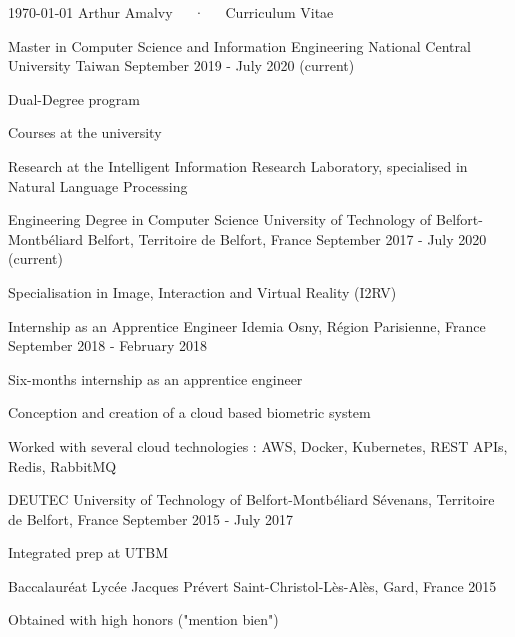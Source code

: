 \documentclass[11pt, a4paper]{awesome-cv}
\begin{document}
\makecvheader

\makecvfooter
  {\today}
  {Arthur Amalvy~~~·~~~Curriculum Vitae}
  {\thepage}



\begin{cventries}

  \cventry
  {Master in Computer Science and Information Engineering} %
  {National Central University} %
  {Taiwan} %
  {September 2019 - July 2020 (current)} %
  {
    \begin{cvitems} %
      \item Dual-Degree program
      \item Courses at the university 
      \item Research at the Intelligent Information Research Laboratory, specialised in Natural Language Processing
    \end{cvitems}
  }

  \cventry
  {Engineering Degree in Computer Science}
  {University of Technology of Belfort-Montbéliard}
  {Belfort, Territoire de Belfort, France}
  {September 2017 - July 2020 (current)}
  {
    \begin{cvitems}
      \item Specialisation in Image, Interaction and Virtual Reality (I2RV)
    \end{cvitems}
  }

  \cventry
  {Internship as an Apprentice Engineer}
  {Idemia}
  {Osny, Région Parisienne, France}
  {September 2018 - February 2018}
  {
    \begin{cvitems}
      \item Six-months internship as an apprentice engineer
      \item Conception and creation of a cloud based biometric system
      \item Worked with several cloud technologies : AWS, Docker, Kubernetes, REST APIs, Redis, RabbitMQ
    \end{cvitems}
  }

  \cventry
  {DEUTEC}
  {University of Technology of Belfort-Montbéliard}
  {Sévenans, Territoire de Belfort, France}
  {September 2015 - July 2017}
  {
    \begin{cvitems}
      \item Integrated prep at UTBM
    \end{cvitems}
  }

  \cventry
  {Baccalauréat}
  {Lycée Jacques Prévert}
  {Saint-Christol-Lès-Alès, Gard, France}
  {2015}
  {
    \begin{cvitems}
      \item Obtained with high honors ("mention bien")
    \end{cvitems}
  }

\end{cventries}
\end{document}
